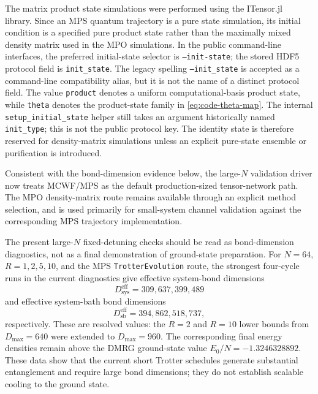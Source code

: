 \documentclass[aps,pra,twocolumn,superscriptaddress,nolongbibliography,nobalancelastpage,10pt]{revtex4-2}
\begin{document}
The matrix product state simulations were performed using the ITensor.jl~\cite{Fishman2022ITensor} library. Since an MPS quantum trajectory is a pure state simulation, its initial condition is a specified pure product state rather than the maximally mixed density matrix used in the MPO simulations. In the public command-line interfaces, the preferred initial-state selector is \texttt{--init-state}; the stored HDF5 protocol field is \texttt{init\_state}. The legacy spelling \texttt{--init\_state} is accepted as a command-line compatibility alias, but it is not the name of a distinct protocol field. The value \texttt{product} denotes a uniform computational-basis product state, while \texttt{theta} denotes the product-state family in \eqref{eq:code-theta-map}. The internal \texttt{setup\_initial\_state} helper still takes an argument historically named \texttt{init\_type}; this is not the public protocol key. The identity state is therefore reserved for density-matrix simulations unless an explicit pure-state ensemble or purification is introduced.

Consistent with the bond-dimension evidence below, the large-\(N\) validation
driver now treats MCWF/MPS as the default production-sized tensor-network path.
The MPO density-matrix route remains available through an explicit method
selection, and is used primarily for small-system channel validation against
the corresponding MPS trajectory implementation.

The present large-\(N\) fixed-detuning checks should be read as bond-dimension
diagnostics, not as a final demonstration of ground-state preparation.  For
\(N=64\), \(R=1,2,5,10\), and the MPS \texttt{TrotterEvolution} route, the
strongest four-cycle runs in the current diagnostics give effective system-bond
dimensions
\[
	D_{\mathrm{sys}}^{\mathrm{eff}}=309,637,399,489
\]
and effective system-bath bond dimensions
\[
	D_{\mathrm{sb}}^{\mathrm{eff}}=394, 862, 518, 737,
\]
respectively.  These are resolved values: the \(R=2\) and \(R=10\) lower bounds
from \(D_{\max}=640\) were extended to \(D_{\max}=960\).  The corresponding
final energy densities remain above the DMRG ground-state value
\(E_0/N=-1.3246328892\).  These data show that the current short Trotter
schedules generate substantial entanglement and require large bond dimensions;
they do not establish scalable cooling to the ground state.
\end{document}
